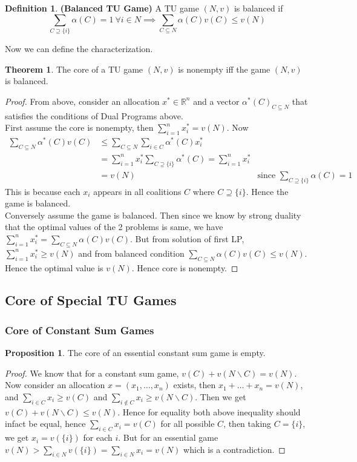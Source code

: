 \documentclass{article}
\theoremstyle{definition}
\newtheorem{theorem}{Theorem}[section]
\newtheorem{defn}{Definition}[section]
\newtheorem{prop}{Proposition}[section]
\begin{document}
\begin{defn}
\textbf{(Balanced TU Game)} A TU game $(N,v)$ is balanced if $$\sum_{C\supseteq \{i\}} \alpha(C) = 1 ~\forall i \in N \implies \sum_{C\subseteq N} \alpha(C)v(C) \leq v(N)$$ 
\end{defn}
Now we can define the characterization.
\begin{theorem}
The core of a TU game $(N,v)$ is nonempty iff the game $(N,v)$ is balanced.
\end{theorem}
\begin{proof}
From above, consider an allocation $x^* \in \mathbb{R}^n$ and a vector $\alpha^*(C)_{C\subseteq N}$ that satisfies the conditions of Dual Programs above.\\
First assume the core is nonempty, then $\sum_{i=1}^n x_i^* = v(N)$. Now 
\begin{align*}
\sum_{C \subseteq N} \alpha^*(C)v(C) &\leq \sum_{C\subseteq N}\sum_{i \in C} \alpha^*(C)x_i^* \\
&= \sum_{i =1}^n x_i^* \sum_{C\supseteq \{i\}}\alpha^*(C) = \sum_{i=1}^n x_i^*\\
&= v(N) &\text{since } \sum_{C\supseteq \{i\}} \alpha(C) = 1
\end{align*} 
This is because each $x_i$ appears in all coalitions $C$ where $C\supseteq \{i\}$. Hence the game is balanced.\\
Conversely assume the game is balanced. Then since we know by strong duality that the optimal values of the 2 problems is same, we have $\sum_{i = 1}^n x_i^* = \sum_{C\subseteq N} \alpha(C)v(C)$. But from solution of first LP, $\sum_{i = 1}^n x_i^* \geq v(N)$ and from balanced condition $\sum_{C\subseteq N} \alpha(C)v(C) \leq v(N)$. Hence the optimal value is $v(N)$. Hence core is nonempty.
\end{proof}
\subsection{Core of Special TU Games}
\subsubsection{Core of Constant Sum Games}
\begin{prop}
The core of an essential constant sum game is empty.
\end{prop}
\begin{proof}
We know that for a constant sum game, $v(C) + v(N\backslash C) = v(N)$. Now consider an allocation $x= (x_1,\dots,x_n)$ exists, then $x_1 + \dots + x_n = v(N)$, and $\sum_{i \in C}x_i \geq v(C)$ and $\sum_{i \notin C} x_i \geq v(N\backslash C)$. Then we get $v(C) + v(N\backslash C) \leq v(N)$. Hence for equality both above inequality should infact be equal, hence $\sum_{i \in C}x_i = v(C)$ for all possible $C$, then taking $C = \{i\}$, we get $x_i = v(\{i\})$ for each $i$. But for an essential game $v(N) > \sum_{i \in N} v(\{i\}) = \sum_{i \in N}x_i = v(N)$ which is a contradiction.
\end{proof}
\end{document}
